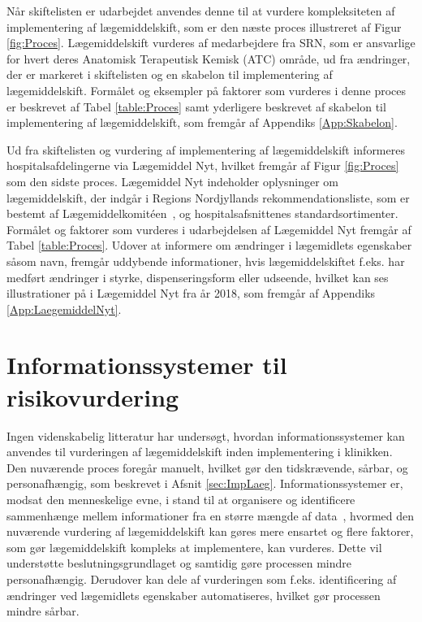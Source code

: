 Når skiftelisten er udarbejdet anvendes denne til at vurdere kompleksiteten af implementering af lægemiddelskift, som er den næste proces illustreret af Figur \ref{fig:Proces}. Lægemiddelskift vurderes af medarbejdere fra SRN, som er ansvarlige for hvert deres Anatomisk Terapeutisk Kemisk (ATC) område, ud fra ændringer, der er markeret i skiftelisten og en skabelon til implementering af lægemiddelskift. Formålet og eksempler på faktorer som vurderes i denne proces er beskrevet af Tabel \ref{table:Proces} samt yderligere beskrevet af skabelon til implementering af lægemiddelskift, som fremgår af Appendiks \ref{App:Skabelon}.

Ud fra skiftelisten og vurdering af implementering af lægemiddelskift informeres hospitalsafdelingerne via Lægemiddel Nyt, hvilket fremgår af Figur \ref{fig:Proces} som den sidste proces. Lægemiddel Nyt indeholder oplysninger om lægemiddelskift, der indgår i Regions Nordjyllands rekommendationsliste, som er bestemt af Lægemiddelkomitéen~\citep{RegionNordjylland2018}, og hospitalsafsnittenes standardsortimenter. Formålet og faktorer som vurderes i udarbejdelsen af Lægemiddel Nyt fremgår af Tabel \ref{table:Proces}. Udover at informere om ændringer i lægemidlets egenskaber såsom navn, fremgår uddybende informationer, hvis lægemiddelskiftet f.eks. har medført ændringer i styrke, dispenseringsform eller udseende, hvilket kan ses illustrationer på i Lægemiddel Nyt fra år 2018, som fremgår af Appendiks \ref{App:LaegemiddelNyt}.  

\section{Informationssystemer til risikovurdering} \label{sec:Inform_Risk}
Ingen videnskabelig litteratur har undersøgt, hvordan informationssystemer kan anvendes til vurderingen af lægemiddelskift inden implementering i klinikken. Den nuværende proces foregår manuelt, hvilket gør den tidskrævende, sårbar, og personafhængig, som beskrevet i Afsnit \ref{sec:ImpLaeg}. Informationssystemer er, modsat den menneskelige evne, i stand til at organisere og identificere sammenhænge mellem informationer fra en større mængde af data~\citep{Agrawal2009}, hvormed den nuværende vurdering af lægemiddelskift kan gøres mere ensartet og flere faktorer, som gør lægemiddelskift kompleks at implementere, kan vurderes. Dette vil understøtte beslutningsgrundlaget og samtidig gøre processen mindre personafhængig. Derudover kan dele af vurderingen som f.eks. identificering af ændringer ved lægemidlets egenskaber automatiseres, hvilket gør processen mindre sårbar. 

